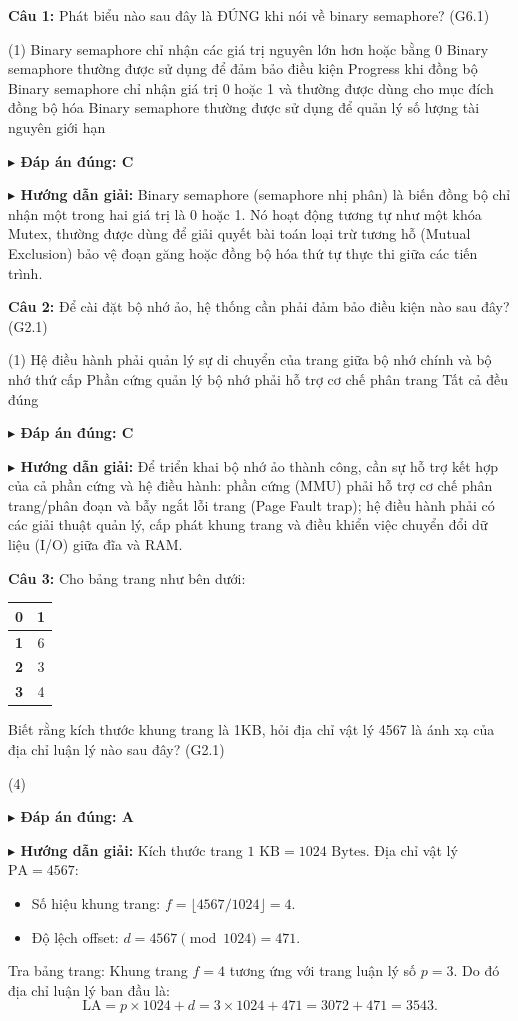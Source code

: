 \documentclass[11pt,a4paper]{article}
\newcommand{\giaithich}[2]{%
    \par\vspace{0.15cm}\noindent
    \begingroup\small
    \noindent\textbf{\color{blue}$\blacktriangleright$ Đáp án đúng: #1} \par\vspace{0.08cm}
    \noindent\textbf{\color{teal}$\blacktriangleright$ Hướng dẫn giải:} #2
    \endgroup\par\vspace{0.35cm}
}
\begin{document}
\vspace{0.3cm}

\noindent\textbf{Câu 1:} Phát biểu nào sau đây là ĐÚNG khi nói về binary semaphore? (G6.1)
\begin{tasks}(1)
    \task Binary semaphore chỉ nhận các giá trị nguyên lớn hơn hoặc bằng 0
    \task Binary semaphore thường được sử dụng để đảm bảo điều kiện Progress khi đồng bộ
    \task Binary semaphore chỉ nhận giá trị 0 hoặc 1 và thường được dùng cho mục đích đồng bộ hóa
    \task Binary semaphore thường được sử dụng để quản lý số lượng tài nguyên giới hạn
\end{tasks}
\giaithich{C}{Binary semaphore (semaphore nhị phân) là biến đồng bộ chỉ nhận một trong hai giá trị là 0 hoặc 1. Nó hoạt động tương tự như một khóa Mutex, thường được dùng để giải quyết bài toán loại trừ tương hỗ (Mutual Exclusion) bảo vệ đoạn găng hoặc đồng bộ hóa thứ tự thực thi giữa các tiến trình.}

\noindent\textbf{Câu 2:} Để cài đặt bộ nhớ ảo, hệ thống cần phải đảm bảo điều kiện nào sau đây? (G2.1)
\begin{tasks}(1)
    \task Hệ điều hành phải quản lý sự di chuyển của trang giữa bộ nhớ chính và bộ nhớ thứ cấp
    \task Phần cứng quản lý bộ nhớ phải hỗ trợ cơ chế phân trang
    \task Tất cả đều đúng
\end{tasks}
\giaithich{C}{Để triển khai bộ nhớ ảo thành công, cần sự hỗ trợ kết hợp của cả phần cứng và hệ điều hành: phần cứng (MMU) phải hỗ trợ cơ chế phân trang/phân đoạn và bẫy ngắt lỗi trang (Page Fault trap); hệ điều hành phải có các giải thuật quản lý, cấp phát khung trang và điều khiển việc chuyển đổi dữ liệu (I/O) giữa đĩa và RAM.}

\noindent\textbf{Câu 3:} Cho bảng trang như bên dưới:
\begin{center}
\begin{tabular}{|c|c|}
\hline
\textbf{0} & 1 \\ \hline
\textbf{1} & 6 \\ \hline
\textbf{2} & 3 \\ \hline
\textbf{3} & 4 \\ \hline
\end{tabular}
\end{center}
Biết rằng kích thước khung trang là 1KB, hỏi địa chỉ vật lý 4567 là ánh xạ của địa chỉ luận lý nào sau đây? (G2.1)
\begin{tasks}(4)
\end{tasks}
\giaithich{A}{Kích thước trang $1\text{ KB} = 1024\text{ Bytes}$. Địa chỉ vật lý $\text{PA} = 4567$:
\begin{itemize}[noitemsep,topsep=1pt]
    \item Số hiệu khung trang: $f = \lfloor 4567 / 1024 \rfloor = 4$.
    \item Độ lệch offset: $d = 4567 \pmod{1024} = 471$.
\end{itemize}
Tra bảng trang: Khung trang $f = 4$ tương ứng với trang luận lý số $p = 3$.
Do đó địa chỉ luận lý ban đầu là:
$$\text{LA} = p \times 1024 + d = 3 \times 1024 + 471 = 3072 + 471 = 3543.$$}
\end{document}
